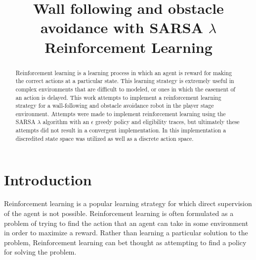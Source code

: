 \documentclass[conference]{IEEEtran}
\begin{document}
%
\title{Wall following and obstacle avoidance with SARSA $\lambda$ Reinforcement Learning}


\author{
}



\maketitle


\begin{abstract}
\boldmath
Reinforcement learning is a learning process in which an agent is reward for making the correct actions at a particular state. 
This learning strategy is extremely useful in complex environments that are difficult to modeled, or ones in which the easement of an action is delayed.
This work attempts to implement a reinforcement learning strategy for a wall-following and obstacle avoidance robot in the player stage environment.
Attempts were made to implement reinforcement learning using the SARSA $\lambda$ algorithm with an $\epsilon$ greedy policy and eligibility traces, but ultimately these attempts did not result in a convergent implementation.
In this implementation a discredited state space was utilized as well as a discrete action space.
\end{abstract}
\IEEEpeerreviewmaketitle



\section{Introduction}

Reinforcement learning is a popular learning strategy for which direct supervision of the agent is not possible. 
Reinforcement learning is often formulated as a problem of trying to find the action that an agent can take in some environment in order to maximize a reward.
Rather than learning a particular solution to the problem, Reinforcement learning can bet thought as attempting to find a policy for solving the problem.  
\end{document}
